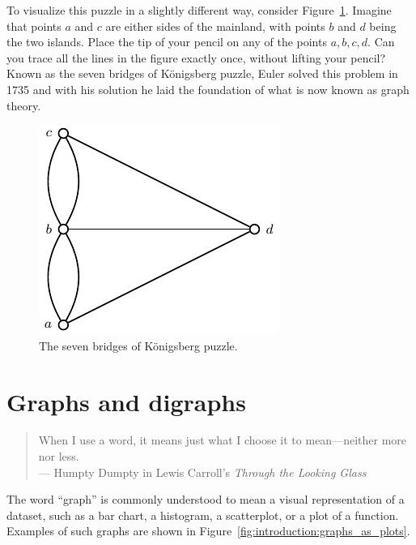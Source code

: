 To visualize this puzzle in a slightly different way, consider
Figure~\ref{fig:introduction:seven_bridges_Konigsberg}. Imagine that
points $a$ and $c$ are either sides of the mainland, with points $b$
and $d$ being the two islands. Place the tip of your pencil on any of
the points $a,b,c,d$. Can you trace all the lines in the figure
exactly once, without lifting your pencil? Known as the seven bridges
of K\"onigsberg puzzle, Euler solved this problem in 1735 and with his
solution he laid the foundation of what is now known as graph theory.

\begin{figure}[!htbp]
\centering
{}
\includegraphics{image/introduction/seven-bridges-Konigsberg}
\caption{The seven bridges of K\"onigsberg puzzle.}
\label{fig:introduction:seven_bridges_Konigsberg}
\end{figure}



\newpage

\section{Graphs and digraphs}
\label{sec:introduction:graphs_digraphs}

\begin{quote}
\footnotesize
When I use a word, it means just what I choose it to mean---neither
more nor less.\\
\noindent
--- Humpty Dumpty in
Lewis Carroll's
\emph{Through the Looking Glass}
\end{quote}

\noindent
The word ``graph'' is commonly understood to mean a visual
representation of a dataset, such as a bar chart, a histogram, a
scatterplot, or a plot of a function. Examples of such graphs are
shown in Figure~\ref{fig:introduction:graphs_as_plots}.

